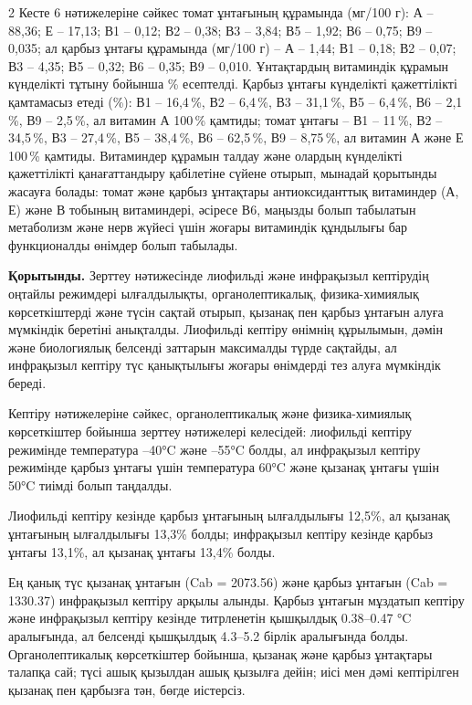 \begin{multicols}{2}
Кесте 6 нәтижелеріне сәйкес томат ұнтағының құрамында (мг/100 г): А --
88,36; Е -- 17,13; В1 -- 0,12; В2 -- 0,38; В3 -- 3,84; В5 -- 1,92; В6 --
0,75; В9 -- 0,035; ал қарбыз ұнтағы құрамында (мг/100 г) -- А -- 1,44;
В1 -- 0,18; В2 -- 0,07; В3 -- 4,35; В5 -- 0,32; В6 -- 0,35; В9 -- 0,010.
Ұнтақтардың витаминдік құрамын күнделікті тұтыну бойынша \% есептелді.
Қарбыз ұнтағы күнделікті қажеттілікті қамтамасыз етеді (\%): В1 --
16,4\,\%, В2 -- 6,4\,\%, В3 -- 31,1\,\%, В5 -- 6,4\,\%, В6 -- 2,1\,\%,
В9 -- 2,5\,\%, ал витамин А 100\,\% қамтиды; томат ұнтағы -- В1 --
11\,\%, В2 -- 34,5\,\%, В3 -- 27,4\,\%, В5 -- 38,4\,\%, В6 -- 62,5\,\%,
В9 -- 8,75\,\%, ал витамин А және Е 100\,\% қамтиды. Витаминдер құрамын
талдау және олардың күнделікті қажеттілікті қанағаттандыру қабілетіне
сүйене отырып, мынадай қорытынды жасауға болады: томат және қарбыз
ұнтақтары антиоксиданттық витаминдер (А, Е) және В тобының витаминдері,
әсіресе В6, маңызды болып табылатын метаболизм және нерв жүйесі үшін
жоғары витаминдік құндылығы бар функционалды өнімдер болып табылады.

{\bfseries Қорытынды.} Зерттеу нәтижесінде лиофильді және инфрақызыл
кептірудің оңтайлы режимдері ылғалдылықты, органолептикалық,
физика-химиялық көрсеткіштерді және түсін сақтай отырып, қызанақ пен
қарбыз ұнтағын алуға мүмкіндік беретіні анықталды. Лиофильді кептіру
өнімнің құрылымын, дәмін және биологиялық белсенді заттарын максималды
түрде сақтайды, ал инфрақызыл кептіру түс қанықтылығы жоғары өнімдерді
тез алуға мүмкіндік береді.

Кептіру нәтижелеріне сәйкес, органолептикалық және физика-химиялық
көрсеткіштер бойынша зерттеу нәтижелері келесідей: лиофильді кептіру
режимінде температура --40°C және --55°C болды, ал инфрақызыл кептіру
режимінде қарбыз ұнтағы үшін температура 60°C және қызанақ ұнтағы үшін
50°C тиімді болып таңдалды.

Лиофильді кептіру кезінде қарбыз ұнтағының ылғалдылығы 12,5\%, ал
қызанақ ұнтағының ылғалдылығы 13,3\% болды; инфрақызыл кептіру кезінде
қарбыз ұнтағы 13,1\%, ал қызанақ ұнтағы 13,4\% болды.

Ең қанық түс қызанақ ұнтағын (Cab = 2073.56) және қарбыз ұнтағын (Cab =
1330.37) инфрақызыл кептіру арқылы алынды. Қарбыз ұнтағын мұздатып
кептіру және инфрақызыл кептіру кезінде титрленетін қышқылдық 0.38--0.47
°C аралығында, ал белсенді қышқылдық 4.3--5.2 бірлік аралығында болды.
Органолептикалық көрсеткіштер бойынша, қызанақ және қарбыз ұнтақтары
талапқа сай; түсі ашық қызылдан ашық қызылға дейін; иісі мен дәмі
кептірілген қызанақ пен қарбызға тән, бөгде иістерсіз.


\end{multicols}
